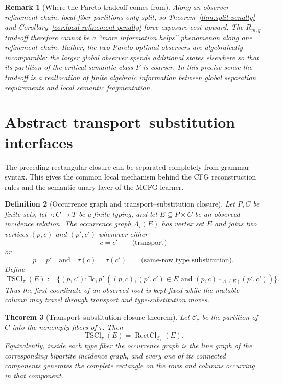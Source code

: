\documentclass[11pt]{article}
\newtheorem{definition}{Definition}[section]
\newtheorem{theorem}[definition]{Theorem}
\newtheorem{remark}[definition]{Remark}
\newcommand{\RectCl}{\operatorname{RectCl}}
\begin{document}
\begin{remark}[Where the Pareto tradeoff comes from]
Along an observer-refinement chain, local fiber partitions only split, so
Theorem~\ref{thm:split-penalty} and
Corollary~\ref{cor:local-refinement-penalty} force exposure cost upward.  The
$R_{m,q}$ tradeoff therefore cannot be a ``more information helps'' phenomenon
along one refinement chain.  Rather, the two Pareto-optimal observers are
algebraically incomparable: the larger global observer spends additional
states elsewhere so that its partition of the critical semantic class $F$ is
\emph{coarser}.  In this precise sense the tradeoff is a reallocation of finite
algebraic information between global separation requirements and local
semantic fragmentation.
\end{remark}

\section{Abstract transport--substitution interfaces}

The preceding rectangular closure can be separated completely from grammar
syntax.  This gives the common local mechanism behind the CFG reconstruction
rules and the semantic-unary layer of the MCFG learner.

\begin{definition}[Occurrence graph and transport--substitution closure]
Let $P,C$ be finite sets, let $\tau:C\to T$ be a finite typing, and let
$E\subseteq P\times C$ be an observed incidence relation.  The
\emph{occurrence graph} $\Lambda_\tau(E)$ has vertex set $E$ and joins two
vertices $(p,c)$ and $(p',c')$ whenever either
\[
 c=c' \qquad\text{(transport)}
\]
or
\[
 p=p'\quad\text{and}\quad \tau(c)=\tau(c')
 \qquad\text{(same-row type substitution)}.
\]
Define
\[
 \operatorname{TSCl}_\tau(E)
 :=
 \{(p,c'):\exists c,p'\ ((p,c),(p',c')\in E
 \text{ and }(p,c)\sim_{\Lambda_\tau(E)}(p',c'))\}.
\]
Thus the first coordinate of an observed root is kept fixed while the mutable
column may travel through transport and type-substitution moves.
\end{definition}

\begin{theorem}[Transport--substitution closure theorem]
\label{thm:ts-closure}
Let $\mathcal C_\tau$ be the partition of $C$ into the nonempty fibers of
$\tau$.  Then
\[
 \boxed{
 \operatorname{TSCl}_\tau(E)
 =
 \RectCl_{\mathcal C_\tau}(E).
 }
\]
Equivalently, inside each type fiber the occurrence graph is the line graph of
the corresponding bipartite incidence graph, and every one of its connected
components generates the complete rectangle on the rows and columns occurring
in that component.
\end{theorem}
\end{document}
